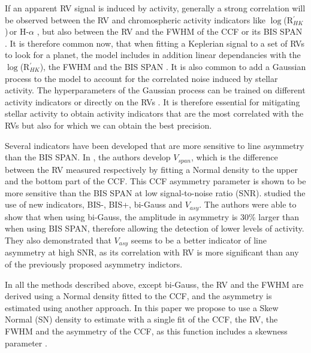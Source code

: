 \documentclass{aa}
\def\logrhk{$\log$(R$^{\prime}_{HK}$)}
\begin{document}
If an apparent RV signal is induced by activity, generally a strong correlation will be observed between the RV and chromospheric activity indicators like \logrhk\,or H-$\alpha$ \citep{Boisse-2009,Dumusque-2012,Robertson-2014}, but also between the RV and the FWHM of the CCF or its BIS SPAN \citep[][]{Queloz-2001,Boisse-2009,Queloz-2009,Dumusque-2016a}. 
%
It is therefore common now, that when fitting a Keplerian signal to a set of RVs to look for a planet, the model includes in addition linear dependancies with the \logrhk, the FWHM and the BIS SPAN \citep{Dumusque:2017aa,Feng:2017aa}.
%
It is also common to add a Gaussian process to the model to account for the correlated noise induced by stellar activity. The hyperparameters of the Gaussian process can be trained on different activity indicators \citep{Haywood-2014,Rajpaul-2015} or directly on the RVs \citep{Faria-2016a}. It is therefore essential for mitigating stellar activity to obtain activity indicators that are the most correlated with the RVs but also for which we can obtain the best precision.

Several indicators have been developed that are more sensitive to line asymmetry than the BIS SPAN. In \citet{Boisse-2011}, the authors develop $V_{span}$, which is the difference between the RV measured respectively by fitting a Normal density to the upper and the bottom part of the CCF. This CCF asymmetry parameter is shown to be more sensitive than the BIS SPAN at low signal-to-noise ratio (SNR).
%
\citet{Figueira-2013} studied the use of new indicators, BIS-, BIS+, bi-Gauss and $V_{asy}$. The authors were able to show that when using bi-Gauss, the amplitude in asymmetry is 30\% larger than when using BIS SPAN, therefore allowing the detection of lower levels of activity. They also demonstrated that $V_{asy}$ seems to be a better indicator of line asymmetry at high SNR, as its correlation with RV is more significant than any of the previously proposed asymmetry indictors.

In all the methods described above, except bi-Gauss, the RV and the FWHM are derived using a Normal density fitted to the CCF, and the asymmetry is estimated using another approach. 
%
In this paper we propose to use a Skew Normal (SN) density to estimate with a single fit of the CCF, the RV, the FWHM and the asymmetry of the CCF, as this function includes a skewness parameter \citep[][]{Azzalini1985}. 
\end{document}
